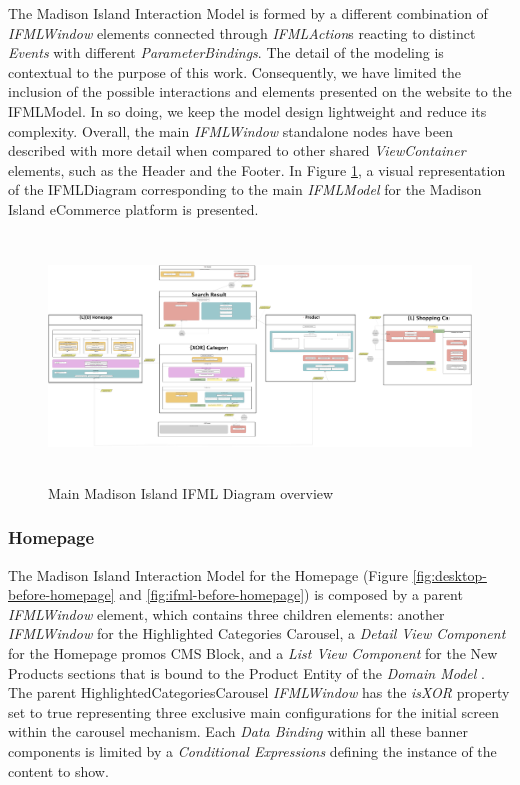 The Madison Island Interaction Model is formed by a different combination of \textit{IFMLWindow} elements connected through \textit{IFMLAction}s reacting to distinct \textit{Events} with different \textit{ParameterBindings}. The detail of the modeling is contextual to the purpose of this work. Consequently, we have limited the inclusion of the possible interactions and elements presented on the website to the IFMLModel. In so doing, we keep the model design lightweight and reduce its complexity. Overall, the main \textit{IFMLWindow} standalone nodes have been described with more detail when compared to other shared \textit{ViewContainer} elements, such as the Header and the Footer. In Figure \ref{fig:ifml-before-global}, a visual representation of the IFMLDiagram corresponding to the main \textit{IFMLModel} for the Madison Island eCommerce platform is presented.

\vspace{0.5cm}
\begin{figure}[H]
  \centering
    \includegraphics[height=6.5cm] {images/diagrams/before/ifml-global.png}
  \caption{Main Madison Island IFML Diagram overview}
  \label{fig:ifml-before-global}
\end{figure}
\vspace{0.5cm}
\newpage
\subsubsection{Homepage}

The Madison Island Interaction Model for the Homepage (Figure \ref{fig:desktop-before-homepage} and \ref{fig:ifml-before-homepage}) is composed by a parent \textit{IFMLWindow} element, which contains three children elements: another \textit{IFMLWindow} for the Highlighted Categories Carousel, a \textit{Detail View Component} for the Homepage promos CMS Block, and a \textit{List View Component} for the New Products sections that is bound to the Product Entity of the \textit{Domain Model} . The parent HighlightedCategoriesCarousel \textit{IFMLWindow} has the \textit{isXOR} property set to true representing three exclusive main configurations for the initial screen within the carousel mechanism. Each \textit{Data Binding} within all these banner components is limited by a \textit{Conditional Expressions} defining the instance of the content to show.

